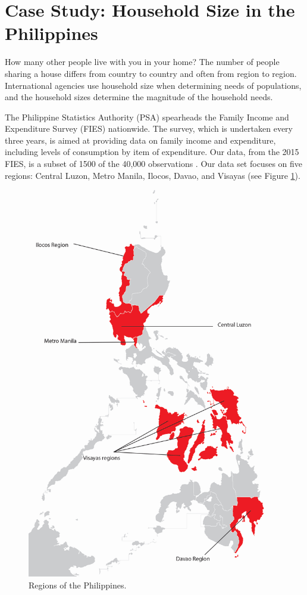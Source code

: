 \documentclass[
]{krantz}
\begin{document}
\hypertarget{cs-philippines}{%
\section{Case Study: Household Size in the Philippines}\label{cs-philippines}}

How many other people live with you in your home? The number of people sharing a house differs from country to country and often from region to region. International agencies use household size when determining needs of populations, and the household sizes determine the magnitude of the household needs.

The Philippine Statistics Authority (PSA) spearheads the Family Income and Expenditure Survey (FIES) nationwide. The survey, which is undertaken every three years, is aimed at providing data on family income and expenditure, including levels of consumption by item of expenditure. Our data, from the 2015 FIES, is a subset of 1500 of the 40,000 observations \citep{PSA}. Our data set focuses on five regions: Central Luzon, Metro Manila, Ilocos, Davao, and Visayas (see Figure \ref{fig:philippinesmap}).

\begin{figure}

{\centering \includegraphics[width=0.5\linewidth]{data/map_of_philippines} 

}

\caption{Regions of the Philippines.}\label{fig:philippinesmap}
\end{figure}
\end{document}
